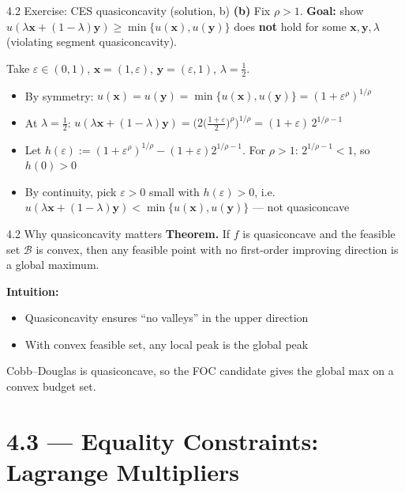 \documentclass[11pt,aspectratio=169]{beamer}
\newcommand{\THFrame}[1]{\begin{frame}{#1 \quad {\small\textcolor{mAccent}{Take home}}}}
\begin{document}
\THFrame{4.2 Exercise: CES quasiconcavity (solution, b)}
  \small
  \textbf{(b)} Fix $\rho>1$. \textbf{Goal:} show $u(\lambda \mathbf{x}+(1-\lambda)\mathbf{y})\geq \min\{u(\mathbf{x}),u(\mathbf{y})\}$ does \textbf{not} hold for some $\mathbf{x},\mathbf{y},\lambda$ (violating segment quasiconcavity).
  
  Take $\varepsilon\in(0,1)$, $\mathbf{x}=(1,\varepsilon)$, $\mathbf{y}=(\varepsilon,1)$, $\lambda=\tfrac12$.
  \begin{itemize}
    \item By symmetry: $u(\mathbf{x})=u(\mathbf{y})=\min\{u(\mathbf{x}),u(\mathbf{y})\}=(1+\varepsilon^\rho)^{1/\rho}$
    \item At $\lambda=\tfrac12$: $u(\lambda \mathbf{x}+(1-\lambda)\mathbf{y})=\bigl(2\bigl(\tfrac{1+\varepsilon}{2}\bigr)^\rho\bigr)^{1/\rho}=(1+\varepsilon)\,2^{1/\rho-1}$
    \item Let $h(\varepsilon):=(1+\varepsilon^\rho)^{1/\rho}-(1+\varepsilon)2^{1/\rho-1}$. For $\rho>1$: $2^{1/\rho-1}<1$, so $h(0)>0$
    \item By continuity, pick $\varepsilon>0$ small with $h(\varepsilon)>0$, i.e.\ $u(\lambda \mathbf{x}+(1-\lambda)\mathbf{y})<\min\{u(\mathbf{x}),u(\mathbf{y})\}$ --- not quasiconcave
  \end{itemize}
\end{frame}

\begin{frame}{4.2 Why quasiconcavity matters}
  \small
  \textbf{Theorem.} If $f$ is quasiconcave and the feasible set $\mathcal{B}$ is convex, then any feasible point with no first-order improving direction is a global maximum.
  
  \textbf{Intuition:}
  
  \begin{itemize}
    \item Quasiconcavity ensures ``no valleys'' in the upper direction
    
    \item With convex feasible set, any local peak is the global peak
  \end{itemize}
  
  Cobb--Douglas is quasiconcave, so the FOC candidate gives the global max on a convex budget set.
\end{frame}

\section{4.3 --- Equality Constraints: Lagrange Multipliers}
\end{document}

